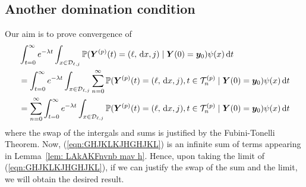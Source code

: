 \subsection{Another domination condition}
Our aim is to prove convergence of 
\begin{align} 
	&\int_{t=0}^\infty e^{-\lambda t}\int_{x\in\mathcal{D}_{\ell,j}}\mathbb P({\boldsymbol Y}^{(p)}(t) = (\ell,\, \mathrm{d} x, j) \mid  \nonumber 
	\boldsymbol Y(0) = \boldsymbol y_0)\psi(x)\, \mathrm{d} t \nonumber
	\\&=\int_{t=0}^\infty e^{-\lambda t}\int_{x\in\mathcal{D}_{\ell,j}}\sum_{n=0}^\infty\mathbb P({\boldsymbol Y}^{(p)}(t) = (\ell,\, \mathrm{d} x, j), t\in\mathcal T_n^{(p)} \mid  \nonumber 
	\boldsymbol Y(0) = \boldsymbol y_0)\psi(x)\, \mathrm{d} t \nonumber
	\\&=\sum_{n=0}^\infty\int_{t=0}^\infty e^{-\lambda t}\int_{x\in\mathcal{D}_{\ell,j}}\mathbb P({\boldsymbol Y}^{(p)}(t) = (\ell,\, \mathrm{d} x, j), t\in\mathcal T_n^{(p)} \mid   
	\boldsymbol Y(0) = \boldsymbol y_0)\psi(x)\, \mathrm{d} t \label{eqn:GHJKLKJHGHJKL}
\end{align}
where the swap of the intergals and sums is justified by the Fubini-Tonelli Theorem. Now, (\ref{eqn:GHJKLKJHGHJKL}) is an infinite sum of terms appearing in Lemma~\ref{lem: LAkAKFnvnb mav h}. Hence, upon taking the limit of (\ref{eqn:GHJKLKJHGHJKL}), if we can justify the swap of the sum and the limit, we will obtain the desired result. %




